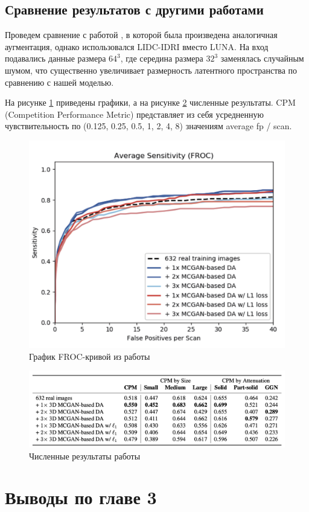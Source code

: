 \subsection{Сравнение результатов с другими работами}

Проведем сравнение с работой \cite{han2019synthesizing}, в которой была произведена аналогичная аугментация, однако использовался LIDC-IDRI вместо LUNA. На вход подавались данные размера $64^3$, где середина размера $32^3$ заменялась случайным шумом, что существенно увеличивает размерность латентного пространства по сравнению с нашей моделью.

На рисунке \ref{han-froc-plot} приведены графики, а на рисунке \ref{han-cpm} численные результаты. CPM (Competition Performance Metric) представляет из себя усредненную чувствительность по (0.125, 0.25, 0.5, 1, 2, 4, 8) значениям average fp / scan.

\begin{figure}[!h]
\includegraphics[width=\linewidth]{images/mcgan-results.png}
\caption{График FROC-кривой из работы \cite{han2019synthesizing}}\label{han-froc-plot}
\centering
\end{figure}

\begin{figure}[!h]
\includegraphics[width=\linewidth]{images/han-cpm.png}
\caption{Численные результаты работы \cite{han2019synthesizing}}\label{han-cpm}
\centering
\end{figure}

\section{Выводы по главе 3}

